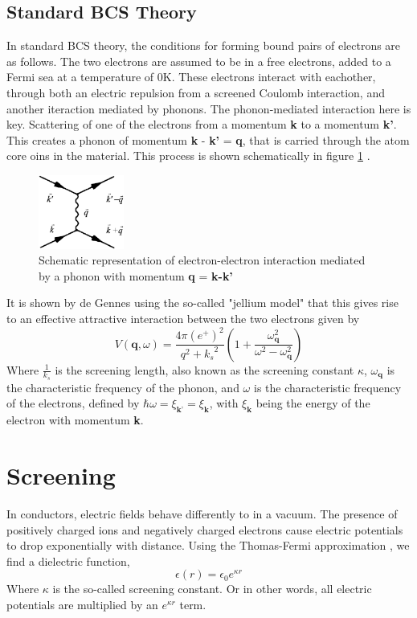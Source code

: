 \subsection{Standard BCS Theory}
In standard BCS theory, the conditions for forming bound pairs of electrons are as follows. The two electrons are assumed to be in a free electrons, added to a Fermi sea at a temperature of 0K. These electrons interact with eachother, through both an electric repulsion from a screened Coulomb interaction, and another iteraction mediated by phonons. The phonon-mediated interaction here is key. Scattering of one of the electrons from a momentum \textbf{k} to a momentum \textbf{k'}. This creates a phonon of momentum \textbf{k} - \textbf{k'} = \textbf{q}, that is carried through the atom core oins in the material. This process is shown schematically in figure \ref{fig:electron_phonon} .

\begin{figure}[h]
    \centering
    \includegraphics[width=0.25\textwidth]{figures/electron_phonon.png}
    \caption{Schematic representation of electron-electron interaction mediated by a phonon with momentum \textbf{q} = \textbf{k-k'}}
    \label{fig:electron_phonon}
\end{figure}

It is shown by de Gennes \cite{Gennes} using the so-called "jellium model" that this gives rise to an effective attractive interaction between the two electrons given by 
\begin{equation}
    V(\textbf{q}, \omega) = \frac{4 \pi (e^+)^2}{q^2 + {k_s}^2} \left( 1 + \frac{\omega_\textbf{q}^2}{\omega^2 - \omega_\textbf{q}^2} \right)
\end{equation}
Where $\frac{1}{k_s}$ is the screening length, also known as the screening constant $\kappa$, $\omega_\mathbf{q}$ is the characteristic frequency of the phonon, and $\omega$ is the characteristic frequency of the electrons, defined by $\hbar \omega = \xi_\textbf{k'} = \xi_\textbf{k}$, with $\xi_\textbf{k}$ being the energy of the electron with momentum \textbf{k}.

\section{Screening} 
In conductors, electric fields behave differently to in a vacuum. The presence of positively charged ions and negatively charged electrons cause electric potentials to drop exponentially with distance. Using the Thomas-Fermi approximation \cite{Ashcroft}, we find a dielectric function,
\begin{equation}
    \epsilon(r) = \epsilon_0 e^{\kappa r}
\end{equation}
Where $\kappa$ is the so-called screening constant. Or in other words, all electric potentials are multiplied by an $e^{\kappa r}$ term.

